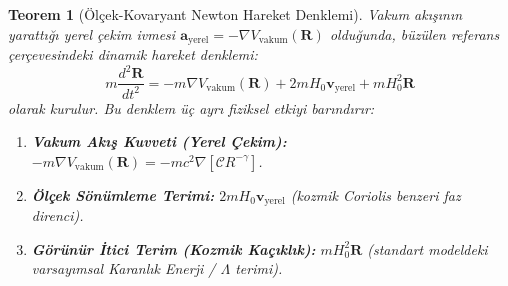 \documentclass[11pt,a4paper]{article}
\newtheorem{theorem}{Teorem}[section]
\begin{document}
\begin{theorem}[Ölçek-Kovaryant Newton Hareket Denklemi]
    \label{thm:olcek_newton_hareket_sc}
    Vakum akışının yarattığı yerel çekim ivmesi $\mathbf{a}_{\mathrm{yerel}} = -\nabla V_{\mathrm{vakum}}(\mathbf{R})$ olduğunda, büzülen referans çerçevesindeki dinamik hareket denklemi:
    \begin{equation}
        m \frac{d^2\mathbf{R}}{dt^2} = - m \nabla V_{\mathrm{vakum}}(\mathbf{R}) + 2 m H_0 \mathbf{v}_{\mathrm{yerel}} + m H_0^2 \mathbf{R}
        \label{eq:olcek_newton_ana}
    \end{equation}
    olarak kurulur. Bu denklem üç ayrı fiziksel etkiyi barındırır:
    \begin{enumerate}
        \item \textbf{Vakum Akış Kuvveti (Yerel Çekim):} $-m \nabla V_{\mathrm{vakum}}(\mathbf{R}) = - m c^2 \nabla \left[ \mathcal{C} R^{-\gamma} \right]$.
        \item \textbf{Ölçek Sönümleme Terimi:} $2 m H_0 \mathbf{v}_{\mathrm{yerel}}$ (kozmik Coriolis benzeri faz direnci).
        \item \textbf{Görünür İtici Terim (Kozmik Kaçıklık):} $m H_0^2 \mathbf{R}$ (standart modeldeki varsayımsal Karanlık Enerji / $\Lambda$ terimi).
    \end{enumerate}
\end{theorem}
\end{document}
